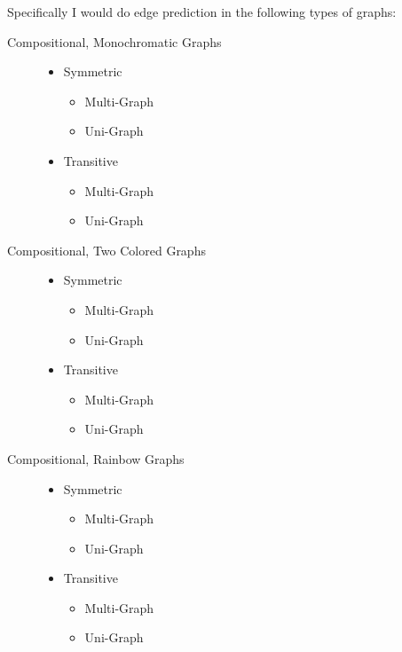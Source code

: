 \documentclass[12pt,answers]{exam} %
\begin{document}
\begin{questions}
{    Specifically I would do edge prediction in the following types of graphs:
    \begin{description}
    \item[Compositional, Monochromatic Graphs]
      \begin{itemize}
      \item Symmetric
        \begin{itemize}
        \item Multi-Graph
        \item Uni-Graph
        \end{itemize}
      \item Transitive
        \begin{itemize}
        \item Multi-Graph
        \item Uni-Graph
        \end{itemize}
      \end{itemize}
    \item[Compositional, Two Colored Graphs]
      \begin{itemize}
      \item Symmetric
        \begin{itemize}
        \item Multi-Graph
        \item Uni-Graph
        \end{itemize}
      \item Transitive
        \begin{itemize}
        \item Multi-Graph
        \item Uni-Graph
        \end{itemize}
      \end{itemize}
    \item[Compositional, Rainbow Graphs]
      \begin{itemize}
      \item Symmetric
        \begin{itemize}
        \item Multi-Graph
        \item Uni-Graph
        \end{itemize}
      \item Transitive
        \begin{itemize}
        \item Multi-Graph
        \item Uni-Graph
        \end{itemize}
      \end{itemize}
    \end{description}

}
\end{questions}
\end{document}
